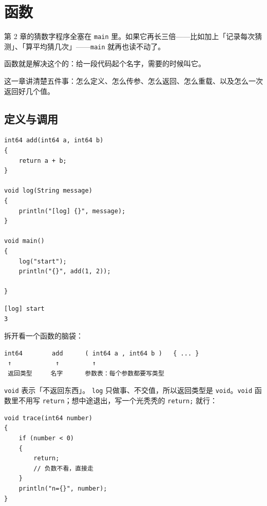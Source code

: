 \chapter{函数}
\label{ch:04}

第 2 章的猜数字程序全塞在 \texttt{main} 里。如果它再长三倍——比如加上「记录每次猜测」、「算平均猜几次」——\texttt{main} 就再也读不动了。

函数就是解决这个的：给一段代码起个名字，需要的时候叫它。

这一章讲清楚五件事：怎么定义、怎么传参、怎么返回、怎么重载、以及怎么一次返回好几个值。

\section{定义与调用}

\par
\medskip
\begin{lstlisting}[style=chali]
int64 add(int64 a, int64 b)
{
    return a + b;
}

void log(String message)
{
    println("[log] {}", message);
}

void main()
{
    log("start");
    println("{}", add(1, 2));

}
\end{lstlisting}
\par
\medskip

\par
\medskip
\begin{lstlisting}[style=out]
[log] start
3
\end{lstlisting}
\par
\medskip

拆开看一个函数的脑袋：

\par
\medskip
\begin{lstlisting}[style=out]
int64        add      ( int64 a , int64 b )   { ... }
 ↑            ↑         ↑
 返回类型     名字      参数表：每个参数都要写类型
\end{lstlisting}
\par
\medskip

\texttt{void} 表示「不返回东西」。 \texttt{log} 只做事、不交值，所以返回类型是 \texttt{void}。\texttt{void} 函数里不用写 \texttt{return}；想中途退出，写一个光秃秃的 \texttt{return;} 就行：

\par
\medskip
\begin{lstlisting}[style=chali]
void trace(int64 number)
{
    if (number < 0)
    {
        return;
        // 负数不看，直接走
    }
    println("n={}", number);
}
\end{lstlisting}
\par
\medskip

